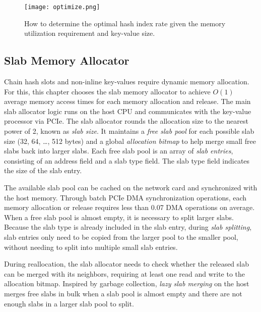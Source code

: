 \begin{figure}[htbp]
	\centering
	\texttt{[image: optimize.png]}
	\caption{How to determine the optimal hash index rate given the memory utilization requirement and key-value size.}
	\label{kvdirect:fig:hashline-ratio}
\end{figure}

\subsection{Slab Memory Allocator}
\label{kvdirect:sec:slab}

Chain hash slots and non-inline key-values require dynamic memory allocation. For this, this chapter chooses the slab memory allocator \cite {bonwick1994slab} to achieve $O(1)$ average memory access times for each memory allocation and release. The main slab allocator logic runs on the host CPU and communicates with the key-value processor via PCIe. The slab allocator rounds the allocation size to the nearest power of 2, known as \textit {slab size}. It maintains a \textit {free slab pool} for each possible slab size (32, 64, \ldots, 512 bytes) and a global \textit {allocation bitmap} to help merge small free slabs back into larger slabs. Each free slab pool is an array of \textit {slab entries}, consisting of an address field and a slab type field. The slab type field indicates the size of the slab entry.

The available slab pool can be cached on the network card and synchronized with the host memory. Through batch PCIe DMA synchronization operations, each memory allocation or release requires less than 0.07 DMA operations on average. When a free slab pool is almost empty, it is necessary to split larger slabs. Because the slab type is already included in the slab entry, during \textit {slab splitting}, slab entries only need to be copied from the larger pool to the smaller pool, without needing to split into multiple small slab entries.

During reallocation, the slab allocator needs to check whether the released slab can be merged with its neighbors, requiring at least one read and write to the allocation bitmap. Inspired by garbage collection, \textit {lazy slab merging} on the host merges free slabs in bulk when a slab pool is almost empty and there are not enough slabs in a larger slab pool to split.

